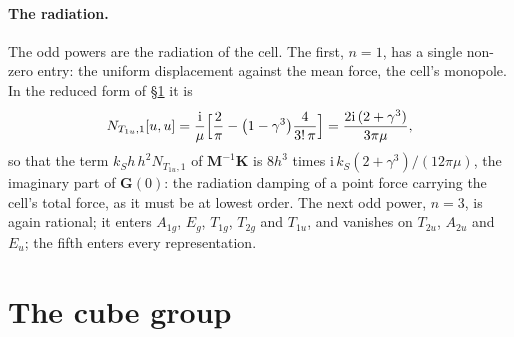 \documentclass[11pt,a4paper]{article}
\newcommand{\bK}{\mathbf{K}}
\newcommand{\bG}{\mathbf{G}}
\newcommand{\bM}{\mathbf{M}}
\begin{document}
\paragraph{The radiation.} The odd powers are the radiation of the cell. The first, $n=1$, has a single
non-zero entry: the uniform displacement against the mean force, the cell's monopole. In the reduced form
of \S\ref{sec:group} it is
\begin{equation}\label{eq:radiation}
  N_{T_{1u},1}[u,u]=\frac{\mathrm i}{\mu}\Bigl[\frac{2}{\pi}-\bigl(1-\gamma^3\bigr)\frac{4}{3!\,\pi}\Bigr]
  =\frac{2\mathrm i\,(2+\gamma^3)}{3\pi\mu},
\end{equation}
so that the term $k_Sh\,h^2N_{T_{1u},1}$ of $\bM^{-1}\bK$ is $8h^3$ times
$\mathrm i\,k_S(2+\gamma^3)/(12\pi\mu)$, the imaginary part of $\bG(0)$: the radiation damping of a point
force carrying the cell's total force, as it must be at lowest order. The next odd power, $n=3$, is
again rational; it enters $A_{1g}$, $E_g$, $T_{1g}$, $T_{2g}$ and $T_{1u}$, and vanishes on $T_{2u}$,
$A_{2u}$ and $E_u$; the fifth enters every representation.

\section{The cube group}\label{sec:group}
\end{document}
